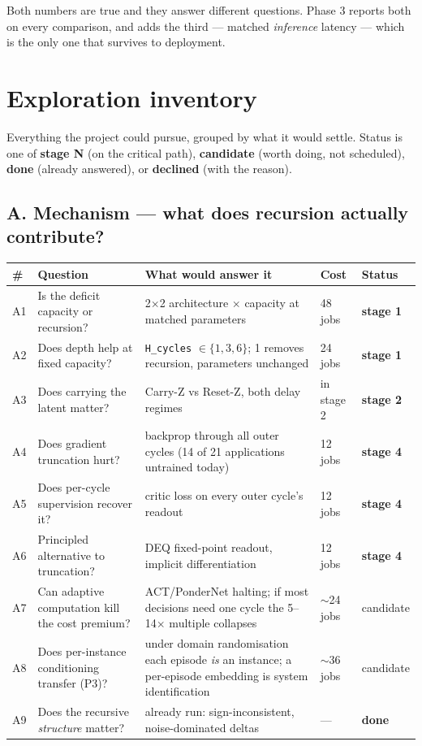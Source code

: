 \documentclass[11pt]{article}
\newcommand{\code}[1]{\texttt{\small #1}}
\begin{document}
Both numbers are true and they answer different questions. Phase 3 reports both on every comparison, and adds the third --- matched \emph{inference} latency --- which is the only one that survives to deployment.

\section{Exploration inventory}

Everything the project could pursue, grouped by what it would settle. Status is one of \textbf{stage N} (on the critical path), \textbf{candidate} (worth doing, not scheduled), \textbf{done} (already answered), or \textbf{declined} (with the reason).

\subsection{A. Mechanism --- what does recursion actually contribute?}

\begin{center}\footnotesize
\begin{tabular}{@{}lp{}p{}ll@{}}
\toprule
\textbf{\#} & \textbf{Question} & \textbf{What would answer it} & \textbf{Cost} & \textbf{Status} \\
\midrule
A1 & Is the deficit capacity or recursion? & 2$\times$2 architecture $\times$ capacity at matched parameters & 48 jobs & \textbf{stage 1} \\
A2 & Does depth help at fixed capacity? & \code{H\_cycles} $\in \{1,3,6\}$; 1 removes recursion, parameters unchanged & 24 jobs & \textbf{stage 1} \\
A3 & Does carrying the latent matter? & Carry-Z vs Reset-Z, both delay regimes & in stage 2 & \textbf{stage 2} \\
A4 & Does gradient truncation hurt? & backprop through all outer cycles (14 of 21 applications untrained today) & 12 jobs & \textbf{stage 4} \\
A5 & Does per-cycle supervision recover it? & critic loss on every outer cycle's readout & 12 jobs & \textbf{stage 4} \\
A6 & Principled alternative to truncation? & DEQ fixed-point readout, implicit differentiation & 12 jobs & \textbf{stage 4} \\
A7 & Can adaptive computation kill the cost premium? & ACT/PonderNet halting; if most decisions need one cycle the 5--14$\times$ multiple collapses & ${\sim}$24 jobs & candidate \\
A8 & Does per-instance conditioning transfer (P3)? & under domain randomisation each episode \emph{is} an instance; a per-episode embedding is system identification & ${\sim}$36 jobs & candidate \\
A9 & Does the recursive \emph{structure} matter? & already run: sign-inconsistent, noise-dominated deltas & --- & \textbf{done} \\
\bottomrule
\end{tabular}
\end{center}
\end{document}
